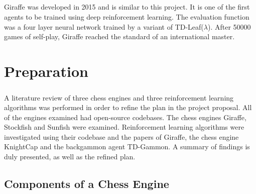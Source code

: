 \documentclass[12pt,a4paper]{book}
\begin{document}
\paragraph{} Giraffe was developed in 2015 and is similar to this project. It is one of the first agents to be trained using deep reinforcement learning. The evaluation function was a four layer neural network trained by a variant of TD-Leaf($\lambda$). After 50000 games of self-play, Giraffe reached the standard of an international master. \cite{giraffe}

\chapter{Preparation}

\paragraph{} A literature review of three chess engines and three reinforcement learning algorithms was performed in order to refine the plan in the project proposal. All of the engines examined had open-source codebases. The chess engines Giraffe, Stockfish and Sunfish were examined. Reinforcement learning algorithms were investigated using their codebase and the papers of Giraffe, the chess engine KnightCap and the backgammon agent TD-Gammon. A summary of findings is duly presented, as well as the refined plan.


\section{Components of a Chess Engine}

\end{document}
